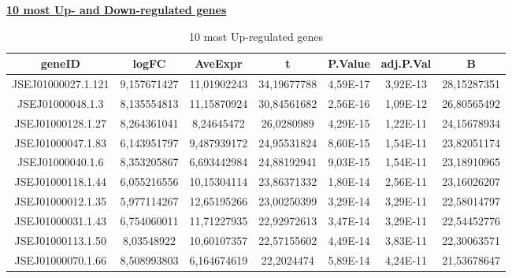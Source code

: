 \documentclass[12pt, a4paper]{report}
\begin{document}
\underline{\textbf{10 most Up- and Down-regulated genes}} 
\begin{table}[H]
	\centering
	\scriptsize
	\begin{tabular}{c|c|c|c|c|c|c}
		\textbf{geneID}& \textbf{logFC}&\textbf{AveExpr}&\textbf{t}&\textbf{P.Value}&\textbf{adj.P.Val}& \textbf{B}\\
		\hline
JSEJ01000027.1.121	&9,157671427&	11,01902243&	34,19677788&	4,59E-17&	3,92E-13&	28,15287351\\
JSEJ01000048.1.3&	8,135554813	&11,15870924&	30,84561682&	2,56E-16&	1,09E-12&	26,80565492\\
JSEJ01000128.1.27&	8,264361041&	8,24645472&	26,0280989&	4,29E-15&	1,22E-11&	24,15678934\\
JSEJ01000047.1.83&	6,143951797&	9,487939172&	24,95531824&	8,60E-15&	1,54E-11&	23,82051174\\
JSEJ01000040.1.6&	8,353205867&	6,693442984&	24,88192941&	9,03E-15&	1,54E-11&	23,18910965\\
JSEJ01000118.1.44&	6,055216556&	10,15304114&	23,86371332&	1,80E-14&	2,56E-11&	23,16026207\\
JSEJ01000012.1.35&	5,977114267&	12,65195266&	23,00250399&	3,29E-14&	3,29E-11&	22,58014797\\
JSEJ01000031.1.43&	6,754060011&	11,71227935&	22,92972613&	3,47E-14&	3,29E-11&	22,54452776\\
JSEJ01000113.1.50&	8,03548922&	10,60107357&	22,57155602&	4,49E-14&	3,83E-11&	22,30063571\\
JSEJ01000070.1.66&	8,508993803&	6,164674619&	22,2024474&	5,89E-14&	4,24E-11&	21,53678647\\
		\hline
		\end{tabular}
	\caption{10 most Up-regulated genes}
\end{table}
\end{document}
